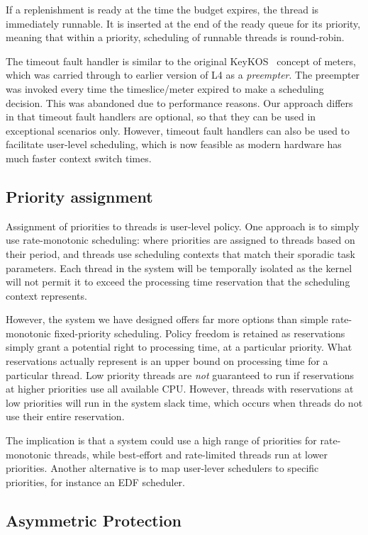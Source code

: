 If a replenishment is ready at the time the budget expires, the thread
is immediately runnable. It is inserted at the end of the ready queue
for its priority, meaning that within a priority, scheduling of
runnable threads is round-robin.

The timeout fault handler is similar to the original KeyKOS~\citep{Bomberger_FFHLS_92} concept of
meters, which was carried through to earlier version of L4 as a \emph{preempter}. The preempter was
invoked every time the timeslice/meter expired to make a scheduling decision. This was abandoned due
to performance reasons. Our approach differs in that timeout fault handlers are optional, so that
they can be used in exceptional scenarios only. However, timeout fault handlers can also be used to
facilitate user-level scheduling, which is now feasible as modern hardware has much faster context
switch times. 

\subsection{Priority assignment}

Assignment of priorities to threads is user-level policy. One approach is to simply use
rate-monotonic scheduling: where priorities are assigned to threads based on their period, and
threads use scheduling contexts that match their sporadic task parameters.  Each thread in the
system will be temporally isolated as the kernel will not permit it to exceed the processing time
reservation that the scheduling context represents.

However, the system we have designed offers far more options than simple rate-monotonic fixed-priority
scheduling.  Policy freedom is retained as reservations simply grant a potential right to processing
time, at a particular priority.  What reservations actually represent is an upper bound on
processing time for a particular thread.  Low priority threads are \emph{not} guaranteed to run if
reservations at higher priorities use all available CPU.  However, threads with reservations at low
priorities will run in the system slack time, which occurs when threads do not use their entire
reservation.

The implication is that a system could use a high range of priorities for rate-monotonic threads,
while best-effort and rate-limited threads run at lower priorities.  Another alternative is to map
user-lever schedulers to specific  priorities, for instance an EDF scheduler. 

\subsection{Asymmetric Protection}

